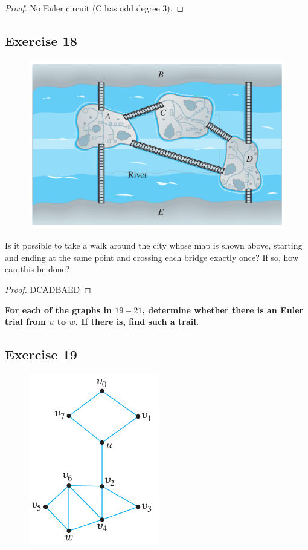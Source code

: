 \documentclass[14pt]{extarticle}
\newcommand{\cy}{\color{cyan}}
\begin{document}
\begin{proof}
    No Euler circuit (C has odd degree 3).
\end{proof}

\subsection{Exercise 18}
\begin{figure}[ht!]
    \centering
    \includegraphics[scale=0.5]{../images/10.1.18.png}
\end{figure}

Is it possible to take a walk around the city whose map is shown above, starting and ending at the same point and
crossing each bridge exactly once? If so, how can this be done?

\begin{proof}
    DCADBAED
\end{proof}

{\bf \cy For each of the graphs in \(19-21\), determine whether there is an Euler trial from \(u\) to \(w\). If there
is, find such a trail.}

\subsection{Exercise 19}
\begin{figure}[ht!]
    \centering
    \includegraphics[scale=0.4]{../images/10.1.19.png}
\end{figure}
\end{document}
